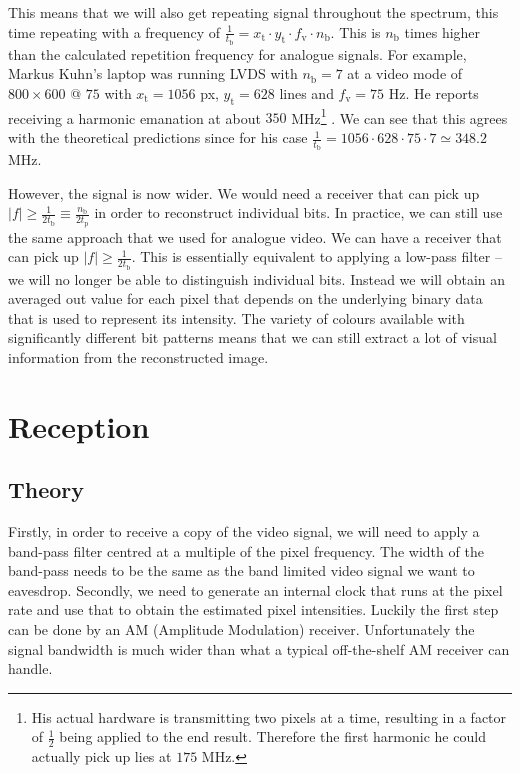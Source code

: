 \documentclass[a4paper,12pt,twoside,openright]{report}
\begin{document}
This means that we will also get repeating signal throughout the spectrum, this time repeating with a frequency of $\frac{1}{t_\text{b}} = x_\text{t} \cdot y_\text{t} \cdot f_\text{v} \cdot n_\text{b}$. This is $n_\text{b}$ times higher than the calculated repetition frequency for analogue signals. For example, Markus Kuhn's laptop was running LVDS with $n_\text{b}=7$ at a video mode of $800 \times 600 $ @ $ 75$ with $x_\text{t} = 1056$ px, $y_\text{t} = 628$ lines and $f_\text{v} = 75$ Hz. He reports receiving a harmonic emanation at about $350$ MHz\footnote{His actual hardware is transmitting two pixels at a time, resulting in a factor of $\frac{1}{2}$ being applied to the end result. Therefore the first harmonic he could actually pick up lies at $175$ MHz.} \cite{kuhn2005electromagnetic}. We can see that this agrees with the theoretical predictions since for his case $\frac{1}{t_\text{b}} = 1056 \cdot 628 \cdot 75 \cdot 7 \simeq 348.2$ MHz.

However, the signal is now wider. We would need a receiver that can pick up $|f| \geq \frac{1}{2 t_\text{b}} \equiv \frac{n_\text{b}}{2 t_\text{p}}$ in order to reconstruct individual bits. In practice, we can still use the same approach that we used for analogue video. We can have a receiver that can pick up $|f| \geq \frac{1}{2 t_\text{b}}$. This is essentially equivalent to applying a low-pass filter -- we will no longer be able to distinguish individual bits. Instead we will obtain an averaged out value for each pixel that depends on the underlying binary data that is used to represent its intensity. The variety of colours available with significantly different bit patterns means that we can still extract a lot of visual information from the reconstructed image.

\section{Reception}

\subsection{Theory}
Firstly, in order to receive a copy of the video signal, we will need to apply a band-pass filter centred at a multiple of the pixel frequency. The width of the band-pass needs to be the same as the band limited video signal we want to eavesdrop. Secondly, we need to generate an internal clock that runs at the pixel rate and use that to obtain the estimated pixel intensities. Luckily the first step can be done by an AM (Amplitude Modulation) receiver. Unfortunately the signal bandwidth is much wider than what a typical off-the-shelf AM receiver can handle.
\end{document}
